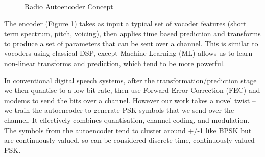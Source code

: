 \documentclass{article}
\begin{document}
\begin{figure}[h]
\caption{Radio Autoencoder Concept}
\label{fig:radae_block}
\begin{center}
\end{center}
\end{figure}

The encoder (Figure \ref{fig:radae_block}) takes as input a typical set of vocoder features (short term spectrum, pitch, voicing), then applies time based prediction and transforms to produce a set of parameters that can be sent over a channel. This is similar to vocoders using classical DSP, except Machine Learning (ML) allows us to learn non-linear transforms and prediction, which tend to be more powerful.

In conventional digital speech systems, after the transformation/prediction stage we then quantise to a low bit rate, then use Forward Error  Correction (FEC) and modems to send the bits over a channel. However our work takes a novel twist – we train the autoencoder to generate PSK symbols that we send over the channel. It effectively combines quantisation, channel coding, and modulation. The symbols from the autoencoder tend to cluster around +/-1 like BPSK but are continuously valued, so can be considered discrete time, continuously valued PSK.
\end{document}
